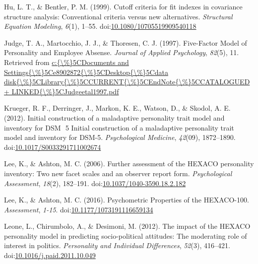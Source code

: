 \documentclass[,man,floatsintext]{apa6}
\theoremstyle{definition}
\theoremstyle{definition}
\theoremstyle{definition}
\theoremstyle{remark}
\begin{document}
\leavevmode\hypertarget{ref-Hu1999}{}%
Hu, L. T., \& Bentler, P. M. (1999). Cutoff criteria for fit indexes in
covariance structure analysis: Conventional criteria versus new
alternatives. \emph{Structural Equation Modeling}, \emph{6}(1), 1--55.
doi:\href{https://doi.org/10.1080/10705519909540118}{10.1080/10705519909540118}

\leavevmode\hypertarget{ref-Judge1997}{}%
Judge, T. A., Martocchio, J. J., \& Thoresen, C. J. (1997). Five-Factor
Model of Personality and Employee Absense. \emph{Journal of Applied
Psychology}, \emph{82}(5), 11. Retrieved from
\href{c:\%7B/\%\%7D5CDocuments\%20and\%20Settings\%7B/\%\%7D5Ce8902872\%7B/\%\%7D5CDesktop\%7B/\%\%7D5Cdata\%20disk\%7B/\%\%7D5CLibrary\%7B/\%\%7D5CCURRENT\%7B/\%\%7D5CEndNote\%7B/\%\%7D5CCATALOGUED\%20+\%20LINKED\%7B/\%\%7D5CJudgeetal1997.pdf}{c:\{\textbackslash{}\%\}5CDocuments and Settings\{\textbackslash{}\%\}5Ce8902872\{\textbackslash{}\%\}5CDesktop\{\textbackslash{}\%\}5Cdata disk\{\textbackslash{}\%\}5CLibrary\{\textbackslash{}\%\}5CCURRENT\{\textbackslash{}\%\}5CEndNote\{\textbackslash{}\%\}5CCATALOGUED + LINKED\{\textbackslash{}\%\}5CJudgeetal1997.pdf}

\leavevmode\hypertarget{ref-Krueger2012a}{}%
Krueger, R. F., Derringer, J., Markon, K. E., Watson, D., \& Skodol, A.
E. (2012). Initial construction of a maladaptive personality trait model
and inventory for DSM ­ 5 Initial construction of a maladaptive
personality trait model and inventory for DSM-5. \emph{Psychological
Medicine}, \emph{42}(09), 1872--1890.
doi:\href{https://doi.org/10.1017/S0033291711002674}{10.1017/S0033291711002674}

\leavevmode\hypertarget{ref-Lee2006}{}%
Lee, K., \& Ashton, M. C. (2006). Further assessment of the HEXACO
personality inventory: Two new facet scales and an observer report form.
\emph{Psychological Assessment}, \emph{18}(2), 182--191.
doi:\href{https://doi.org/10.1037/1040-3590.18.2.182}{10.1037/1040-3590.18.2.182}

\leavevmode\hypertarget{ref-Lee2016}{}%
Lee, K., \& Ashton, M. C. (2016). Psychometric Properties of the
HEXACO-100. \emph{Assessment}, \emph{1-15}.
doi:\href{https://doi.org/10.1177/1073191116659134}{10.1177/1073191116659134}

\leavevmode\hypertarget{ref-Leone2012}{}%
Leone, L., Chirumbolo, A., \& Desimoni, M. (2012). The impact of the
HEXACO personality model in predicting socio-political attitudes: The
moderating role of interest in politics. \emph{Personality and
Individual Differences}, \emph{52}(3), 416--421.
doi:\href{https://doi.org/10.1016/j.paid.2011.10.049}{10.1016/j.paid.2011.10.049}
\end{document}
